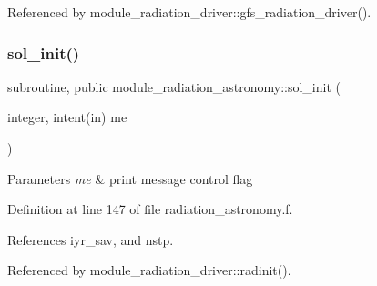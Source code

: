Referenced by module\+\_\+radiation\+\_\+driver\+::gfs\+\_\+radiation\+\_\+driver().

\mbox{\label{group__module__radiation__astronomy_gaa9eeb5462c1dbddb971cee28eb38ca47}} 
\subsubsection{\texorpdfstring{sol\+\_\+init()}{sol\_init()}}
{\footnotesize\ttfamily subroutine, public module\+\_\+radiation\+\_\+astronomy\+::sol\+\_\+init (\begin{DoxyParamCaption}\item[{integer, intent(in)}]{me }\end{DoxyParamCaption})}


\begin{DoxyParams}{Parameters}
{\em me} & print message control flag \\
\hline
\end{DoxyParams}


Definition at line 147 of file radiation\+\_\+astronomy.\+f.



References iyr\+\_\+sav, and nstp.



Referenced by module\+\_\+radiation\+\_\+driver\+::radinit().

\mbox{\label{group__module__radiation__astronomy_ga095550b8122f922ad122db44aa262b15}} 
